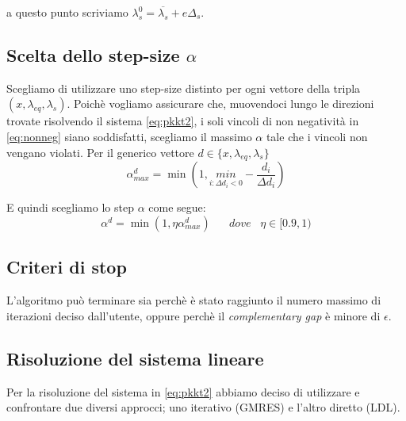 a questo punto scriviamo $\lambda_s^0 = \overline{\lambda_s} + e \Delta_s$. 


\subsection{Scelta dello step-size $\alpha$}
Scegliamo di utilizzare uno step-size distinto per ogni vettore della tripla $(x, \lambda_{eq}, \lambda_s)$.
Poichè vogliamo assicurare che, muovendoci lungo le direzioni trovate risolvendo il sistema \ref{eq:pkkt2}, i soli vincoli di non negatività in \ref{eq:nonneg} siano soddisfatti, scegliamo il massimo $\alpha$ tale che i vincoli non vengano violati.
Per il generico vettore $d \in \{x,\lambda_{eq},\lambda_s\} $ 
\begin{equation}\label{eq:alpha}
    \alpha^d_{max} = \min (1, \underset{i:\Delta d_i < 0}{min}-\frac{d_i}{\Delta d_i})
\end{equation}

E quindi scegliamo lo step $\alpha$ come segue:
\begin{equation}\label{eq:alphaFinale}
\alpha^d = \min(1, \eta \alpha^d_{max}) \;\;\;\;\;\; dove\;\;\; \eta \in [0.9, 1)
\end{equation}


\subsection{Criteri di stop}\label{cap:stop}
L'algoritmo può terminare sia perchè è stato raggiunto il numero massimo di iterazioni deciso dall'utente, oppure perchè il \textit{complementary gap} è minore di $\epsilon$.



\subsection{Risoluzione del sistema lineare}\label{cap:RISLS}
Per la risoluzione del sistema in \ref{eq:pkkt2} abbiamo deciso di utilizzare e confrontare due diversi approcci; uno iterativo (GMRES) e l'altro diretto (LDL).

